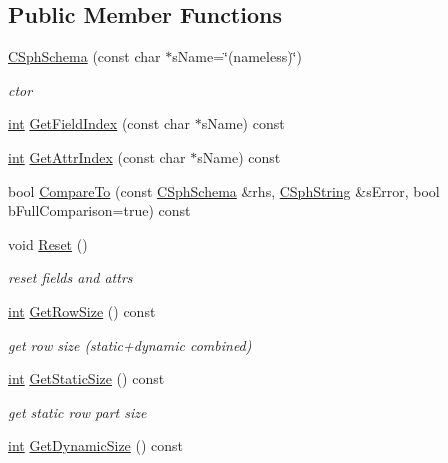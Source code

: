 \subsection*{Public Member Functions}
\begin{DoxyCompactItemize}
\item 
\hyperlink{classCSphSchema_aa74c86ed3b2cd3be70be7e759b400540}{C\-Sph\-Schema} (const char $\ast$s\-Name=\char`\"{}(nameless)\char`\"{})
\begin{DoxyCompactList}\small\item\em ctor \end{DoxyCompactList}\item 
\hyperlink{sphinxexpr_8cpp_a4a26e8f9cb8b736e0c4cbf4d16de985e}{int} \hyperlink{classCSphSchema_adc27620c661b206a4d39dc58359be831}{Get\-Field\-Index} (const char $\ast$s\-Name) const 
\item 
\hyperlink{sphinxexpr_8cpp_a4a26e8f9cb8b736e0c4cbf4d16de985e}{int} \hyperlink{classCSphSchema_abc1a78819c98473bf413ee2113392d65}{Get\-Attr\-Index} (const char $\ast$s\-Name) const 
\item 
bool \hyperlink{classCSphSchema_a865b3e684893a133c0252562eca2670d}{Compare\-To} (const \hyperlink{classCSphSchema}{C\-Sph\-Schema} \&rhs, \hyperlink{structCSphString}{C\-Sph\-String} \&s\-Error, bool b\-Full\-Comparison=true) const 
\item 
void \hyperlink{classCSphSchema_aa5d8cee88cf63cd8d89bf6088c114179}{Reset} ()
\begin{DoxyCompactList}\small\item\em reset fields and attrs \end{DoxyCompactList}\item 
\hyperlink{sphinxexpr_8cpp_a4a26e8f9cb8b736e0c4cbf4d16de985e}{int} \hyperlink{classCSphSchema_a17fe9adba0a1dd20072c80fcda3ccdb6}{Get\-Row\-Size} () const 
\begin{DoxyCompactList}\small\item\em get row size (static+dynamic combined) \end{DoxyCompactList}\item 
\hyperlink{sphinxexpr_8cpp_a4a26e8f9cb8b736e0c4cbf4d16de985e}{int} \hyperlink{classCSphSchema_ac50ab0879879ccd940e6ed99b812d61e}{Get\-Static\-Size} () const 
\begin{DoxyCompactList}\small\item\em get static row part size \end{DoxyCompactList}\item 
\hyperlink{sphinxexpr_8cpp_a4a26e8f9cb8b736e0c4cbf4d16de985e}{int} \hyperlink{classCSphSchema_a18b6830a1285302d1c4652e19431c91b}{Get\-Dynamic\-Size} () const 

\end{DoxyCompactItemize}
